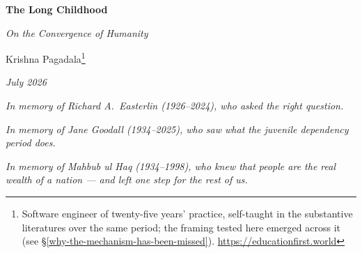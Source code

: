 \documentclass[12pt,letterpaper]{article}
\begin{document}
\begin{titlepage}
\begin{center}
\vspace*{2cm}
{\LARGE\bfseries The Long Childhood\par}
\vspace{0.5cm}
{\large\itshape On the Convergence of Humanity\par}
\vspace{1.5cm}
{\large Krishna Pagadala\footnote{Software engineer of twenty-five years' practice, self-taught in the substantive literatures over the same period; the framing tested here emerged across it (see \S\ref{why-the-mechanism-has-been-missed}). \url{https://educationfirst.world}}\par}
\vspace{0.5cm}
{\normalsize\itshape July 2026\par}
\vspace{1cm}
{\small\itshape In memory of Richard A.\ Easterlin (1926--2024), who asked the right question.\par}
\vspace{0.5cm}
{\small\itshape In memory of Jane Goodall (1934--2025), who saw what the juvenile dependency period does.\par}
\vspace{0.5cm}
{\small\itshape In memory of Mahbub ul Haq (1934--1998), who knew that people are the real wealth of a nation --- and left one step for the rest of us.\par}
\vspace{1cm}
\end{center}

\begin{abstract}
\noindent Humans have the longest juvenile dependency of any species
--- nearly two decades of plastic brain growth embedded with adult
teachers. This window is the channel through which one generation
installs a cognitive architecture in the next deep enough to use,
extend, and transmit. Wallace's theory explained how species
differentiate under isolation; I document the inverse --- what one
species has done with its window, post-1960, at population scale. By
2022, 154 countries --- across every political system and
continent --- have crossed a shared developmental threshold:
fertility below 3.65 births per woman and life expectancy above 69.8
years (the 1960 United States values) --- the crossing itself. The
convergence is the population-scale signature of loading schooling
into the long childhood; its absence is the signature of failing to
do so. More broadly, the outcomes I predict the mechanism moves ---
fertility, longevity, offspring survival --- are the classical
fitness components of life-history theory; this convergence is the
event I predict and explain. I address the
crossing event in the post-decolonization window and its generational
predictor; pre-transition local fertility patterns and post-crossing
trajectory dynamics are outside my scope.


\end{abstract}
\end{titlepage}
\end{document}
